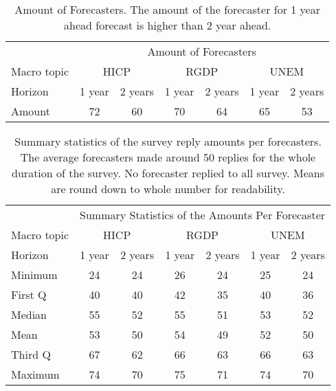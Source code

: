 \documentclass[11pt]{article}
\begin{document}
\begin{table}[!h]
\centering
\caption{Amount of Forecasters. The amount of the forecaster for 1 year ahead forecast is higher than 2 year ahead.}
\label{tab: amount of forecasters}
\begin{tabular}{lcccccc}
\hline
&\multicolumn{6}{c}{Amount of Forecasters}\\
\cmidrule(lr){2-7}
Macro topic & \multicolumn{2}{c}{HICP} & \multicolumn{2}{c}{RGDP} & \multicolumn{2}{c}{UNEM} \\
\cmidrule(lr){2-3} \cmidrule(lr){4-5}\cmidrule(lr){6-7}
Horizon     & 1 year & 2 years & 1 year & 2 years & 1 year & 2 years \\ 
\hline
Amount        &      72   &60          &70         &64         & 65         & 53       \\
\hline
\end{tabular}
\end{table}

\begin{table}[!h]
	\centering
	\caption{Summary statistics of the survey reply amounts per forecasters. The average forecasters made around 50 replies for the whole duration of the survey. No forecaster replied to all survey. Means are round down to whole number for readability.}
	\label{tab: forecaster summary statistics}
	\begin{tabular}{lcccccc}%
		\hline
		&\multicolumn{6}{c}{Summary Statistics of the Amounts Per Forecaster}\\
		\cmidrule(lr){2-7}
		Macro topic & \multicolumn{2}{c}{HICP} & \multicolumn{2}{c}{RGDP} & \multicolumn{2}{c}{UNEM} \\
		\cmidrule(lr){2-3} \cmidrule(lr){4-5}\cmidrule(lr){6-7}
		Horizon     & 1 year & 2 years & 1 year & 2 years & 1 year & 2 years \\ 
		\hline
Minimum & 24    & 24    & 26    & 24    & 25    & 24    \\
First Q & 40    & 40    & 42    & 35    & 40    & 36    \\
Median  & 55    & 52    & 55    & 51    & 53    & 52    \\
Mean    & 53    & 50    & 54    & 49    & 52    & 50    \\
Third Q & 67    & 62    & 66    & 63    & 66    & 63    \\
Maximum & 74    & 70    & 75    & 71    & 74    & 70      \\ 
		\hline
	\end{tabular}
\end{table}
\end{document}
